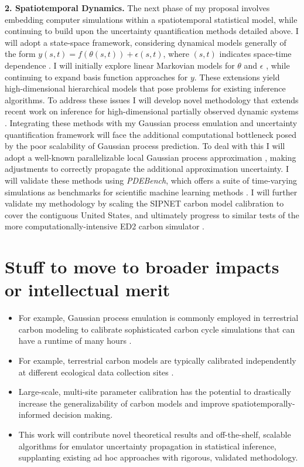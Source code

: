 \documentclass[11pt]{article}
\begin{document}
 \textbf{2. Spatiotemporal Dynamics.}
 The next phase of my proposal involves embedding computer simulations within a spatiotemporal statistical model, while continuing to build upon the uncertainty quantification methods detailed above. I will adopt a state-space framework, considering dynamical models generally of the form $y(s, t) = f(\theta(s, t)) + \epsilon(s, t)$, where $(s, t)$ indicates space-time dependence \cite{Wikle, Hefley}. I will initially explore linear Markovian models for $\theta$ and $\epsilon$ \cite{Hefley}, while continuing to expand basis function approaches for $y$. 
These extensions yield high-dimensional hierarchical models that pose problems for existing inference algorithms. To address these issues I will develop novel methodology that extends recent work on inference for high-dimensional partially observed dynamic systems \cite{Park}. Integrating these methods with my Gaussian process emulation and uncertainty quantification framework will face the additional computational bottleneck posed by the poor scalability of Gaussian process prediction. To deal with this I will adopt a well-known parallelizable local Gaussian process approximation \cite{Gramacy}, making adjustments to correctly propagate the additional approximation uncertainty. I will validate these methods using \textit{PDEBench}, which offers a suite of time-varying simulations as benchmarks for scientific machine learning methods \cite{Takamoto}. I will further validate my methodology by scaling the SIPNET carbon model calibration to cover the contiguous United States, and ultimately progress to similar tests of the more computationally-intensive ED2 carbon simulator \cite{Fer, Fer2}.

\section{Stuff to move to broader impacts or intellectual merit}
\begin{itemize}
\item For example, Gaussian process emulation is commonly employed in terrestrial carbon modeling to calibrate sophisticated carbon cycle simulations that can have a runtime of many hours \cite{Fer}.
\item For example, terrestrial carbon models are typically calibrated independently at different ecological data collection sites \cite{Fer2}.
\item Large-scale, multi-site parameter calibration has the potential to drastically increase the generalizability of carbon models and improve spatiotemporally-informed decision making. 
\item This work will contribute novel theoretical results and off-the-shelf, scalable algorithms for emulator uncertainty propagation in statistical inference, supplanting existing ad hoc approaches with rigorous, validated methodology. 
\end{itemize}
\end{document}
